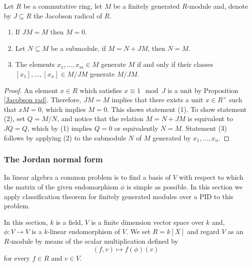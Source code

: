 \documentclass[12pt, a4paper]{article}
\begin{document}
\begin{mdcor}
    Let \(R\) be a commutative ring, let \(M\) be a finitely generated \(R\)-module and, denote by \(J\subseteq R\) the Jacobson radical of \(R\).
    \begin{enumerate}
        \item If \(JM=M\) then \(M=0\).
        \item Let \(N \subseteq M\) be a submodule, if \(M=N+JM\), then \(N=M\).
        \item The elements \(x_1,\ldots,x_m \in M\) generate \(M\) if and only if their classes \([x_1],\ldots,[x_n] \in M/JM\) generate \(M/JM\).
    \end{enumerate}
\end{mdcor}

\begin{proof}
    An element \( x \in R \) which satisfies \( x \equiv 1 \mod{J} \) is a unit by Proposition \ref{Jacobson rad}. Therefore, \( JM = M \) implies that there exists a unit \( x \in R^{\times} \) such that \( xM = 0 \), which implies \( M = 0 \). This shows statement (1). To show statement (2), set \( Q = M/N \), and notice that the relation \( M = N + JM \) is equivalent to \( JQ = Q \), which by (1) implies \( Q = 0 \) or equivalently \( N = M \). Statement (3) follows by applying (2) to the submodule \( N \) of \( M \) generated by \( x_1, \ldots, x_n \).
\end{proof}

\subsubsection{The Jordan normal form}

\begin{mdnote}
    In linear algebra a common problem is to find a basis of \(V\) with respect to which the matrix of the given endomorphism \(\phi\) is simple as possible. In this section we apply classification theorem for finitely generated modules over a PID to this problem.
\end{mdnote}

\begin{mdnote}[SETUP]
    In this section, \(k\) is a field, \(V\) is a finite dimension vector space over \(k\) and, \(\phi:V\to V\) is a \(k\)-linear endomorphism of \(V\).
    We set \(R=k[X]\) and regard \(V\) as an \(R\)-module by means of the scalar multiplication defined by 
    \[(f,v)\mapsto f(\phi)(v)\]
    for every \(f\in R\) and \(v\in V\).
\end{mdnote}
\end{document}
